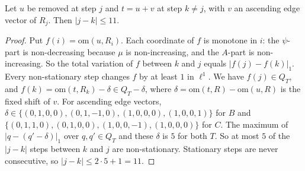 \documentclass[11pt]{article}
\theoremstyle{definition}\newtheorem{definition}[theorem]{Definition}\newtheorem{remark}[theorem]{Remark}
\begin{document}
\begin{lemma}[window]\label{lem:window}
Let $u$ be removed at step $j$ and $t=u+v$ at step $k\neq j$, with $v$ an ascending edge vector of $R_j$. Then $|j-k|\le11$.
\end{lemma}
\begin{proof}
Put $f(i)=\mathrm{om}(u,R_i)$. Each coordinate of $f$ is monotone in $i$: the $\psi$-part is non-decreasing because $\mu$ is non-increasing, and the $A$-part is non-increasing. So the total variation of $f$ between $k$ and $j$ equals $|f(j)-f(k)|_1$.
Every non-stationary step changes $f$ by at least $1$ in $\ell^1$. We have $f(j)\in Q_T$, and $f(k)=\mathrm{om}(t,R_k)-\delta\in Q_T-\delta$, where $\delta=\mathrm{om}(t,R)-\mathrm{om}(u,R)$ is the fixed shift of $v$. For ascending edge vectors, $\delta\in\{(0,1,0,0),(0,1,-1,0),(1,0,0,0),(1,0,0,1)\}$ for $B$ and $\{(0,1,1,0),(0,1,0,0),(1,0,0,-1),(1,0,0,0)\}$ for $C$.
The maximum of $|q-(q'-\delta)|_1$ over $q,q'\in Q_T$ and these $\delta$ is $5$ for both $T$. So at most $5$ of the $|j-k|$ steps between $k$ and $j$ are non-stationary. Stationary steps are never consecutive, so $|j-k|\le 2\cdot5+1=11$.
\end{proof}
\end{document}
